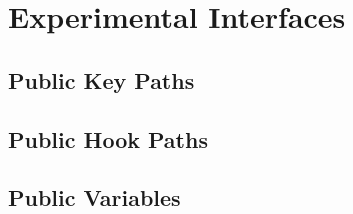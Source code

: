 \documentclass[oneside]{book}
\begin{document}
\chapter{Experimental Interfaces}


\section{Public Key Paths}

\section{Public Hook Paths}

\section{Public Variables}
\end{document}
